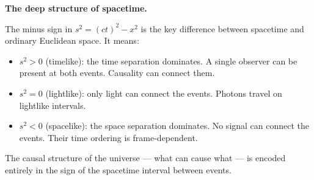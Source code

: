 \documentclass[12pt, a4paper, twoside]{book}
\begin{document}
\begin{discoverybox}
\textbf{The deep structure of spacetime.}

The minus sign in $s^2 = (ct)^2 - x^2$ is the key difference between spacetime and ordinary Euclidean space. It means:

\begin{itemize}[leftmargin=1.5em,itemsep=3pt]
  \item $s^2 > 0$ (timelike): the time separation dominates. A single observer can be present at both events. Causality can connect them.
  \item $s^2 = 0$ (lightlike): only light can connect the events. Photons travel on lightlike intervals.
  \item $s^2 < 0$ (spacelike): the space separation dominates. No signal can connect the events. Their time ordering is frame-dependent.
\end{itemize}

The causal structure of the universe --- what can cause what --- is encoded entirely in the sign of the spacetime interval between events.
\end{discoverybox}
\end{document}
